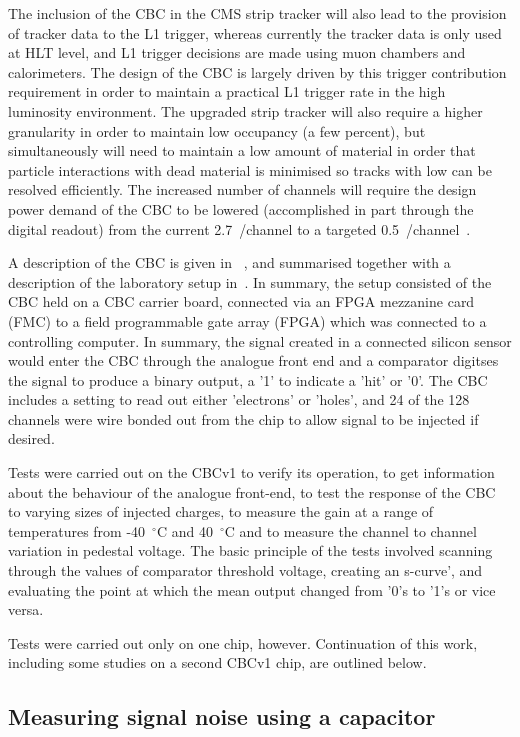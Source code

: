 The inclusion of the CBC in the CMS strip tracker will also lead to the provision of tracker data to the L1
trigger, whereas currently the tracker data is only used at HLT level, and L1 trigger decisions are made using
muon chambers and calorimeters. The design of the CBC is largely driven by this trigger contribution
requirement in order to maintain a practical L1 trigger rate in the high luminosity environment. The upgraded
strip tracker will also require a higher granularity in order to maintain low occupancy (a few percent), but
simultaneously will need to maintain a low amount of material in order that particle interactions with dead
material is minimised so tracks with low \pt can be resolved efficiently. The increased number of channels
will require the design power demand of the CBC to be lowered (accomplished in part through the digital
readout) from the current 2.7~\mW/channel to a targeted 0.5~\mW/channel~\cite{JonesL,Ferguson:2012cg,Raymond:2012zz}.

A description of the CBC is given in ~\cite{JonesL}, and summarised together with a description of the
laboratory setup in~\cite{JacobJA}. In summary, the setup consisted of the CBC held on a CBC carrier board,
connected via an FPGA mezzanine card (FMC) to a field programmable gate array (FPGA) which was connected to a
controlling computer. In summary, the signal created in a connected silicon sensor would enter the CBC through
the analogue front end and a comparator digitses the signal to produce a binary output, a '1' to indicate a
'hit' or '0'. The CBC includes a setting to read out either 'electrons' or 'holes', and 24 of the 128
channels were wire bonded out from the chip to allow signal to be injected if desired.

Tests were carried out on the CBCv1 to verify its operation, to get information about the behaviour of the
analogue front-end, to test the response of the CBC to varying sizes of injected charges, to measure the gain
at a range of temperatures from -40~$^{\circ}$C and 40~$^{\circ}$C and to measure the channel to channel
variation in pedestal voltage. The basic principle of the tests involved scanning through the values of
comparator threshold voltage, creating an s-curve', and evaluating the point at which the mean output changed
from '0's to '1's or vice versa.

Tests were carried out only on one chip, however. Continuation of this work, including some studies on a
second CBCv1 chip, are outlined below.


\subsection{Measuring signal noise using a capacitor}
\label{ss:measuring_signal_noise_using_a_capacitor}

